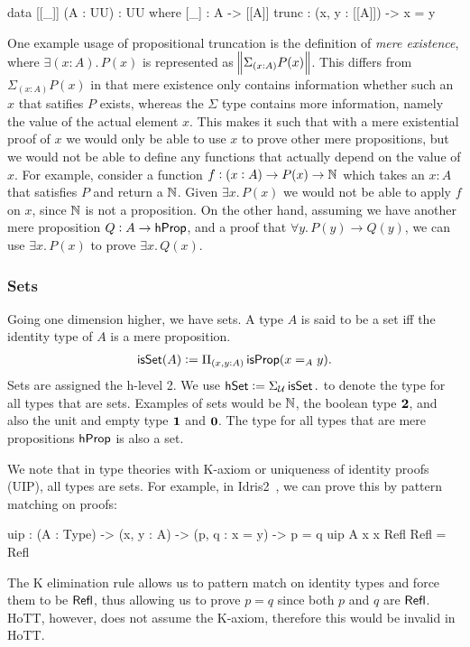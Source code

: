 \begin{code}
data [[_]] (A : UU) : UU where
    [_]  : A -> [[A]]
    trunc : (x, y : [[A]]) -> x = y
\end{code}
One example usage of propositional truncation is the definition of
\emph{mere existence}, where $\exists (x: A).\,P(x)$ is represented
as $\norm{\Sigma_{(x:A)}P(x)}$. This differs from $\Sigma_{(x:A)}P(x)$
in that mere existence only contains information whether such an $x$
that satifies $P$ exists, whereas the $\Sigma$ type contains more information,
namely the value of the actual element $x$. This makes it such that
with a mere existential proof of $x$ we would only be able to use $x$
to prove other mere propositions, but we would not be able to define
any functions that actually depend on the value of $x$. For example,
consider a function $f : (x : A) \to P(x) \to \mathbb{N}$ which takes an $x: A$
that satisfies $P$ and return a $\mathbb{N}$. Given $\exists x.\,P(x)$ we would
not be able to apply $f$ on $x$, since $\mathbb{N}$ is not a proposition. 
On the other hand, assuming we have another mere proposition
$Q : A \to \mathsf{hProp}$, and a proof that $\forall y.\,P(y) \to Q(y)$, 
we can use $\exists x.\,P(x)$ to prove $\exists x.\,Q(x)$.

\subsubsection{Sets}
Going one dimension higher, we have sets. A type $A$ is said to be a set
iff the identity type of $A$ is a mere proposition.
\begin{align*}
    \operatorname{\mathsf{isSet}}(A) := \Pi_{(x,y : A)}\operatorname{\mathsf{isProp}}(x =_A y).
\end{align*}
Sets are assigned the h-level 2.
We use $\mathsf{hSet} := \Sigma_{\mathcal{U}} \operatorname{\mathsf{isSet}}.$ to denote the type for
all types that are sets.
Examples of sets would be $\mathbb{N}$, the boolean type ${\mathbf{2}}$, and also
the unit and empty type ${\mathbf{1}}$ and ${\mathbf{0}}$. The type for all types
that are mere propositions $\mathsf{hProp}$ is also a set.

We note that in type theories with K-axiom or uniqueness of identity proofs
(UIP), all types are sets. For example, in Idris2~\cite{brady_idris_2021},
we can prove this
by pattern matching on proofs:
\begin{code}
uip : (A : Type) -> (x, y : A) -> (p, q : x = y) -> p = q
uip A x x Refl Refl = Refl
\end{code}

The K elimination rule allows us to pattern match on identity types and force
them to be $\operatorname{\mathsf{Refl}}$, thus allowing us to prove $p = q$ since both
$p$ and $q$ are $\operatorname{\mathsf{Refl}}$. HoTT, however, does not assume the K-axiom,
therefore this would be invalid in HoTT.


